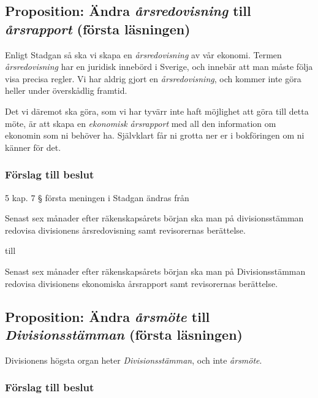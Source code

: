 \documentclass[protokoll]{dvd}
\begin{document}
\newpage
\subsection{Proposition: Ändra \emph{årsredovisning} till \emph{årsrapport} (första läsningen)}

Enligt Stadgan så ska vi skapa en \emph{årsredovisning} av vår ekonomi.
Termen \emph{årsredovisning} har en juridisk innebörd i Sverige, och innebär att man måste följa visa precisa regler.
Vi har aldrig gjort en \emph{årsredovisning}, och kommer inte göra heller under överskådlig framtid.

Det vi däremot ska göra, som vi har tyvärr inte haft möjlighet att göra till detta möte, är att skapa en \emph{ekonomisk årsrapport} med all den information om ekonomin som ni behöver ha.
Självklart får ni grotta ner er i bokföringen om ni känner för det.

\subsubsection*{Förslag till beslut}

\begin{attsatser}
	\item 5 kap. 7 § första meningen i Stadgan ändras från

	\begin{displayquote}
        Senast sex månader efter räkenskapsårets början ska man på divisionsstämman redovisa divisionens årsredovisning samt revisorernas berättelse.
    \end{displayquote}

    till

    \begin{displayquote}
        Senast sex månader efter räkenskapsårets början ska man på Divisionsstämman redovisa divisionens ekonomiska årsrapport samt revisorernas berättelse.
    \end{displayquote}
\end{attsatser}

\newpage
\subsection{Proposition: Ändra \emph{årsmöte} till \emph{Divisionsstämman} (första läsningen)}

Divisionens högsta organ heter \emph{Divisionsstämman}, och inte \emph{årsmöte}.

\subsubsection*{Förslag till beslut}
\end{document}
